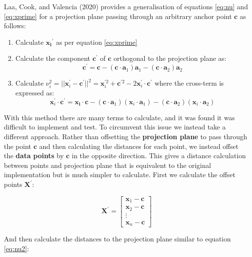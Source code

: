 Laa, Cook, and Valencia (2020) provides a generalisation of equations \eqref{eq:nu} and \eqref{eq:xprime} for a projection plane passing through an arbitrary anchor point \(\mathbf{c}\) as follows:

\begin{enumerate}
\def\labelenumi{\arabic{enumi}.}
\tightlist
\item
  Calculate \(\mathbf{x_i}^\prime\) as per equation \eqref{eq:xprime}
\item
  Calculate the component \(\mathbf{c}^\prime\) of \(\mathbf{c}\) orthogonal to the projection plane as:
  \[
  \mathbf{c}^\prime = \mathbf{c} - (\mathbf{c} \cdot \mathbf{a}_1)\mathbf{a}_1 - (\mathbf{c} \cdot \mathbf{a}_2)\mathbf{a}_2
  \]
\item
  Calculate \(\nu_i^2 = || \mathbf{x}_i^\prime - \mathbf{c}^\prime ||^2 = \mathbf{x}_i^{\prime 2} + \mathbf{c}^{\prime 2} - 2\mathbf{x}_i^\prime \cdot \mathbf{c}^\prime\) where the cross-term is expressed as:
  \[
  \mathbf{x}_i^\prime \cdot \mathbf{c}^\prime = \mathbf{x_i} \cdot \mathbf{c} - 
    (\mathbf{c} \cdot \mathbf{a}_1)(\mathbf{x}_i \cdot \mathbf{a}_1) -
    (\mathbf{c} \cdot \mathbf{a}_2)(\mathbf{x}_i \cdot \mathbf{a}_2)
  \]
\end{enumerate}

With this method there are many terms to calculate, and it was found it was difficult to implement and test. To circumvent this issue we instead take a different approach. Rather than offsetting the \textbf{projection plane} to pass through the point \(\mathbf{c}\) and then calculating the distances for each point, we instead offset the \textbf{data points} by \(\mathbf{c}\) in the opposite direction. This gives a distance calculation between points and projection plane that is equivalent to the original implementation but is much simpler to calculate. First we calculate the offset points \(\mathbf{X}^\prime\):

\begin{equation}
\mathbf{X}^\prime = \begin{bmatrix}
    \mathbf{x}_1 - \mathbf{c} \\
    \mathbf{x}_2 - \mathbf{c} \\
    \vdots \\
    \mathbf{x}_n - \mathbf{c}
    \end{bmatrix}
\label{eq:xprime2}
\end{equation}

And then calculate the distances to the projection plane similar to equation \eqref{eq:nu2}:


